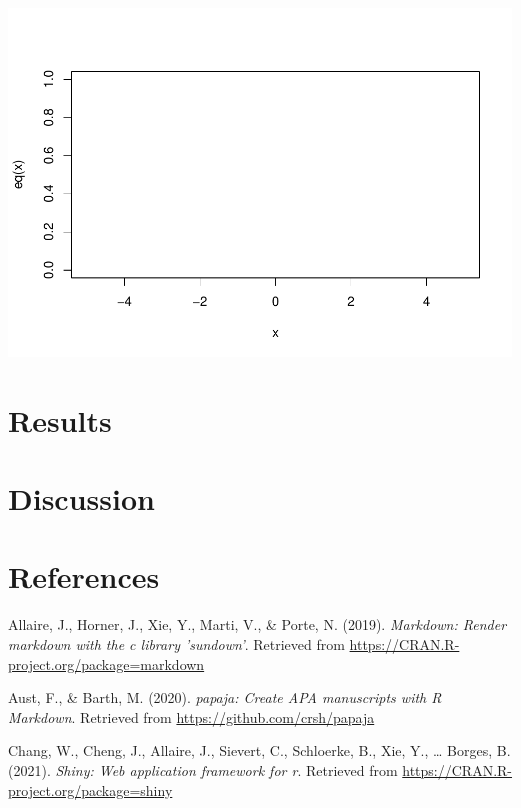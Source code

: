\documentclass[
  english,
  man,floatsintext]{apa6}
\begin{document}
\includegraphics{papaja-test_files/figure-latex/unnamed-chunk-6-1.pdf}

\hypertarget{results}{%
\section{Results}\label{results}}

\hypertarget{discussion}{%
\section{Discussion}\label{discussion}}

\newpage

\hypertarget{references}{%
\section{References}\label{references}}

\begingroup
\setlength{\parindent}{-0.5in}
\setlength{\leftskip}{0.5in}

\hypertarget{refs}{}
\leavevmode\hypertarget{ref-R-markdown}{}%
Allaire, J., Horner, J., Xie, Y., Marti, V., \& Porte, N. (2019). \emph{Markdown: Render markdown with the c library 'sundown'}. Retrieved from \url{https://CRAN.R-project.org/package=markdown}

\leavevmode\hypertarget{ref-R-papaja}{}%
Aust, F., \& Barth, M. (2020). \emph{papaja: Create APA manuscripts with R Markdown}. Retrieved from \url{https://github.com/crsh/papaja}

\leavevmode\hypertarget{ref-R-shiny}{}%
Chang, W., Cheng, J., Allaire, J., Sievert, C., Schloerke, B., Xie, Y., \ldots{} Borges, B. (2021). \emph{Shiny: Web application framework for r}. Retrieved from \url{https://CRAN.R-project.org/package=shiny}
\end{document}
